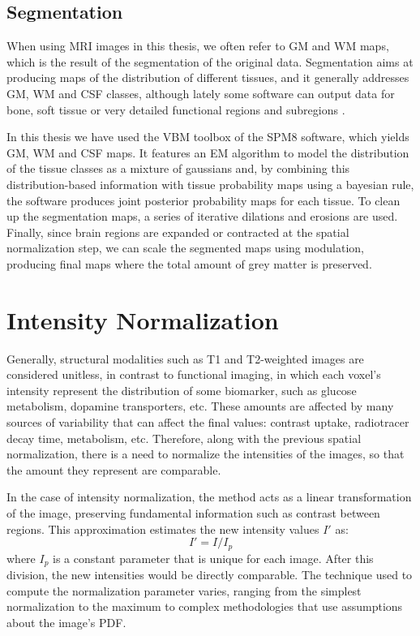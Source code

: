 \subsection{Segmentation}
When using \ac{MRI} images in this thesis, we often refer to \acf{GM} and \acf{WM} maps, which is the result of the segmentation of the original data. Segmentation aims at producing maps of the distribution of different tissues, and it generally addresses \ac{GM}, \ac{WM} and \ac{CSF} classes, although lately some software can output data for bone, soft tissue or very detailed functional regions and subregions \cite{Fischl2002}. 

In this thesis we have used the \ac{VBM} toolbox of the \ac{SPM8} software, which yields \ac{GM}, \ac{WM} and \ac{CSF} maps. It features an \ac{EM} algorithm to model the distribution of the tissue classes as a mixture of gaussians and, by combining this distribution-based information with tissue probability maps using a bayesian rule, the software produces joint posterior probability maps for each tissue. To clean up the segmentation maps, a series of iterative dilations and erosions are used. Finally, since brain regions are expanded or contracted at the spatial normalization step, we can scale the segmented maps using modulation, producing final maps where the total amount of grey matter is preserved. 

\section{Intensity Normalization}\label{sec:intensityPrep}
Generally, structural modalities such as T1 and T2-weighted images are considered unitless, in contrast to functional imaging, in which each voxel's intensity represent the distribution of some biomarker, such as glucose metabolism, dopamine transporters, etc. These amounts are affected by many sources of variability that can affect the final values: contrast uptake, radiotracer decay time, metabolism, etc. Therefore, along with the previous spatial normalization, there is a need to normalize the intensities of the images, so that the amount they represent are comparable. 

In the case of intensity normalization, the method acts as a linear transformation of the image, preserving fundamental information such as contrast between regions. This approximation estimates the new intensity values $I'$ as: 
\begin{equation}
	I' = I/I_p 
\end{equation}
where $I_p$ is a constant parameter that is unique for each image. After this division, the new intensities would be directly comparable. The technique used to compute the normalization parameter varies, ranging from the simplest normalization to the maximum \cite{Salas-Gonzalez2009,Martinez-Murcia20129676} to complex methodologies that use assumptions about the image's \ac{PDF}. 

